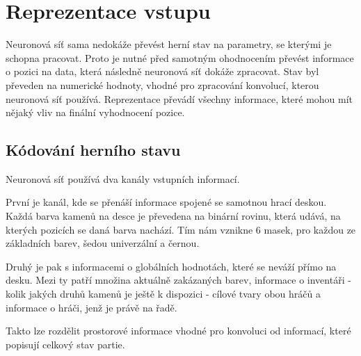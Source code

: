 \section{Reprezentace vstupu}

Neuronová síť sama nedokáže převést herní stav na parametry, se kterými je schopna pracovat. Proto je nutné před samotným ohodnocením převést informace 
o pozici na data, která následně neuronová síť dokáže zpracovat. Stav byl převeden na numerické hodnoty, vhodné pro zpracování konvolucí, kterou neuronová
síť používá. Reprezentace převádí všechny informace, které mohou mít nějaký vliv na finální vyhodnocení pozice.

\subsection{Kódování herního stavu}

Neuronová síť používá dva kanály vstupních informací.

První je kanál, kde se přenáší informace spojené se samotnou hrací deskou. Každá barva kamenů na desce je převedena na binární rovinu, která udává, na kterých 
pozicích se daná barva nachází. Tím nám vznikne 6 masek, pro každou ze základních barev, šedou univerzální a černou.

Druhý je pak s informacemi o globálních hodnotách, které se neváží přímo na desku. Mezi ty patří množina aktuálně zakázaných barev, informace o inventáři - kolik
jakých druhů kamenů je ještě k dispozici - cílové tvary obou hráčů a informace o hráči, jenž je právě na řadě.

Takto lze rozdělit prostorové informace vhodné pro konvoluci od informací, které popisují celkový stav partie.

